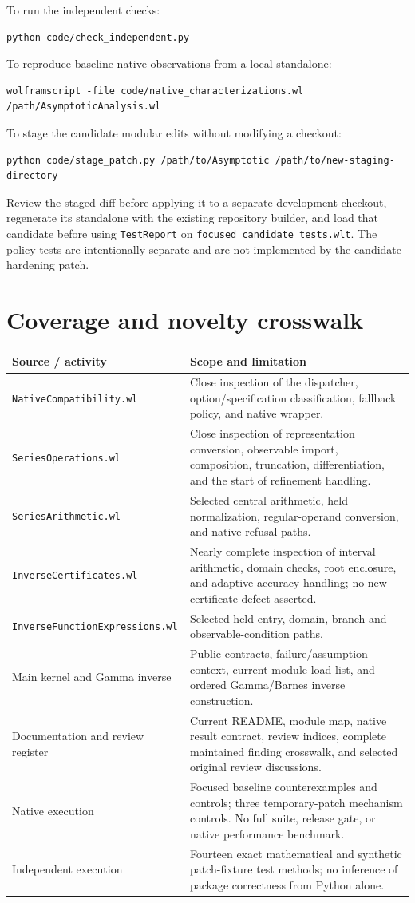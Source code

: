 \documentclass[11pt,letterpaper]{article}
\newcommand{\code}[1]{\nolinkurl{#1}}
\begin{document}
To run the independent checks:
\begin{lstlisting}
python code/check_independent.py
\end{lstlisting}
To reproduce baseline native observations from a local standalone:
\begin{lstlisting}
wolframscript -file code/native_characterizations.wl /path/AsymptoticAnalysis.wl
\end{lstlisting}
To stage the candidate modular edits without modifying a checkout:
\begin{lstlisting}
python code/stage_patch.py /path/to/Asymptotic /path/to/new-staging-directory
\end{lstlisting}
Review the staged diff before applying it to a separate development checkout,
regenerate its standalone with the existing repository builder, and load that
candidate before using \code{TestReport} on \code{focused_candidate_tests.wlt}.
The policy tests are intentionally separate and are not implemented by the
candidate hardening patch.

\section{Coverage and novelty crosswalk}\label{app:coverage}
\begin{longtable}{@{}P{0.34\textwidth}P{0.61\textwidth}@{}}
\toprule
Source / activity & Scope and limitation\\\midrule\endhead
\code{NativeCompatibility.wl} & Close inspection of the dispatcher, option/specification classification, fallback policy, and native wrapper.\\
\code{SeriesOperations.wl} & Close inspection of representation conversion, observable import, composition, truncation, differentiation, and the start of refinement handling.\\
\code{SeriesArithmetic.wl} & Selected central arithmetic, held normalization, regular-operand conversion, and native refusal paths.\\
\code{InverseCertificates.wl} & Nearly complete inspection of interval arithmetic, domain checks, root enclosure, and adaptive accuracy handling; no new certificate defect asserted.\\
\code{InverseFunctionExpressions.wl} & Selected held entry, domain, branch and observable-condition paths.\\
Main kernel and Gamma inverse & Public contracts, failure/assumption context, current module load list, and ordered Gamma/Barnes inverse construction.\\
Documentation and review register & Current README, module map, native result contract, review indices, complete maintained finding crosswalk, and selected original review discussions.\\
Native execution & Focused baseline counterexamples and controls; three temporary-patch mechanism controls. No full suite, release gate, or native performance benchmark.\\
Independent execution & Fourteen exact mathematical and synthetic patch-fixture test methods; no inference of package correctness from Python alone.\\
\bottomrule
\end{longtable}
\end{document}
